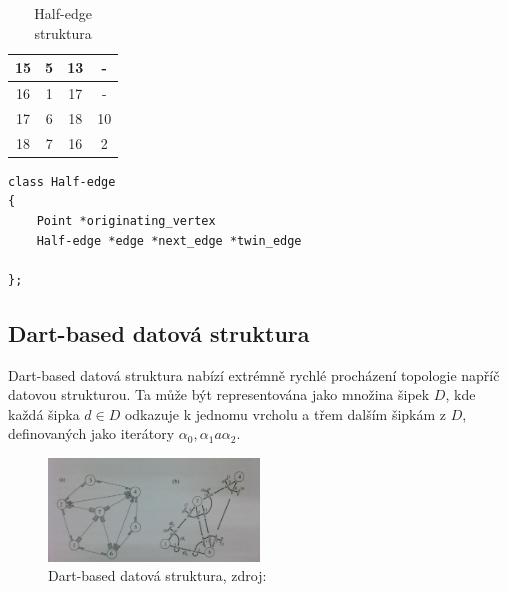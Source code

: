 \documentclass[12pt,a4paper]{article}
\begin{document}
\begin{table}[h!]
\begin{tabular}{|c||c||c|c|}
15                         & 5                                 & 13                         & -         \\ \hline
16                         & 1                                 & 17                         & -         \\ \hline
17                         & 6                                 & 18                         & 10        \\ \hline
18                         & 7                                 & 16                         & 2         \\ \hline
\end{tabular}
\caption{Half-edge struktura}
\label{tab:half_edge}
\end{table}

\newpage
\begin{lstlisting}[caption={Definice datové struktury}]
class Half-edge
{
	Point *originating_vertex
	Half-edge *edge *next_edge *twin_edge
	
};
\end{lstlisting}

\subsection{Dart-based datová struktura}
Dart-based datová struktura nabízí extrémně rychlé procházení topologie napříč datovou strukturou. Ta může být representována jako množina šipek $D$, kde každá šipka $d \in D$ odkazuje k jednomu vrcholu a třem dalším šipkám z $D$, definovaných jako iterátory $\alpha_0, \alpha_1 a \alpha_2$. 

\newpage
\begin{figure}[h!]
\centering
\includegraphics[width=0.5\textwidth, angle=90]{img/dart_struct.jpg}
\caption{Dart-based datová struktura, zdroj: \cite{triangulation}}
\label{fig:dart_struct}
\end{figure}
\end{document}
